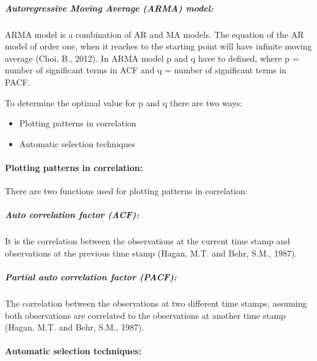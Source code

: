 \documentclass[
  letterpaper,
  DIV=11,
  numbers=noendperiod]{scrartcl}
\let\oldparagraph\paragraph
\renewcommand{\paragraph}[1]{\oldparagraph{#1}\mbox{}}
\let\oldsubparagraph\subparagraph
\renewcommand{\subparagraph}[1]{\oldsubparagraph{#1}\mbox{}}
\begin{document}
\hypertarget{autoregressive-moving-average-arma-model}{%
\subparagraph{\texorpdfstring{\textbf{Autoregressive Moving Average
(ARMA)
model:}}{Autoregressive Moving Average (ARMA) model:}}\label{autoregressive-moving-average-arma-model}}

ARMA model is a combination of AR and MA models. The equation of the AR
model of order one, when it reaches to the starting point will have
infinite moving average (Choi, B., 2012). In ARMA model p and q have to
defined, where p = number of significant terms in ACF and q = number of
significant terms in PACF.

To determine the optimal value for p and q there are two ways:

\begin{itemize}
\item
  Plotting patterns in correlation
\item
  Automatic selection techniques
\end{itemize}

\hypertarget{plotting-patterns-in-correlation}{%
\paragraph{\texorpdfstring{\textbf{Plotting patterns in
correlation:}}{Plotting patterns in correlation:}}\label{plotting-patterns-in-correlation}}

There are two functions used for plotting patterns in correlation:

\hypertarget{auto-correlation-factor-acf}{%
\subparagraph{\texorpdfstring{\textbf{Auto correlation factor
(ACF):}}{Auto correlation factor (ACF):}}\label{auto-correlation-factor-acf}}

It is the correlation between the observations at the current time stamp
and observations at the previous time stamp (Hagan, M.T. and Behr, S.M.,
1987).

\hypertarget{partial-auto-correlation-factor-pacf}{%
\subparagraph{\texorpdfstring{\textbf{Partial auto correlation factor
(PACF):}}{Partial auto correlation factor (PACF):}}\label{partial-auto-correlation-factor-pacf}}

The correlation between the observations at two different time stamps,
assuming both observations are correlated to the observations at another
time stamp (Hagan, M.T. and Behr, S.M., 1987).

\hypertarget{automatic-selection-techniques}{%
\paragraph{\texorpdfstring{\textbf{Automatic selection
techniques:}}{Automatic selection techniques:}}\label{automatic-selection-techniques}}
\end{document}

